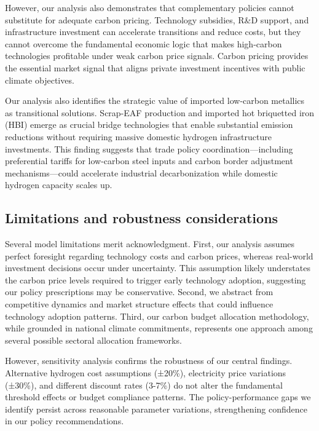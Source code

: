 \documentclass[preprint,1p,authoryear]{elsarticle}
\begin{document}
However, our analysis also demonstrates that complementary policies cannot substitute for adequate carbon pricing. Technology subsidies, R\&D support, and infrastructure investment can accelerate transitions and reduce costs, but they cannot overcome the fundamental economic logic that makes high-carbon technologies profitable under weak carbon price signals. Carbon pricing provides the essential market signal that aligns private investment incentives with public climate objectives.

Our analysis also identifies the strategic value of imported low-carbon metallics as transitional solutions. Scrap-EAF production and imported hot briquetted iron (HBI) emerge as crucial bridge technologies that enable substantial emission reductions without requiring massive domestic hydrogen infrastructure investments. This finding suggests that trade policy coordination—including preferential tariffs for low-carbon steel inputs and carbon border adjustment mechanisms—could accelerate industrial decarbonization while domestic hydrogen capacity scales up.

\subsection{Limitations and robustness considerations}

Several model limitations merit acknowledgment. First, our analysis assumes perfect foresight regarding technology costs and carbon prices, whereas real-world investment decisions occur under uncertainty. This assumption likely understates the carbon price levels required to trigger early technology adoption, suggesting our policy prescriptions may be conservative. Second, we abstract from competitive dynamics and market structure effects that could influence technology adoption patterns. Third, our carbon budget allocation methodology, while grounded in national climate commitments, represents one approach among several possible sectoral allocation frameworks.

However, sensitivity analysis confirms the robustness of our central findings. Alternative hydrogen cost assumptions (±20\%), electricity price variations (±30\%), and different discount rates (3-7\%) do not alter the fundamental threshold effects or budget compliance patterns. The policy-performance gaps we identify persist across reasonable parameter variations, strengthening confidence in our policy recommendations.
\end{document}
